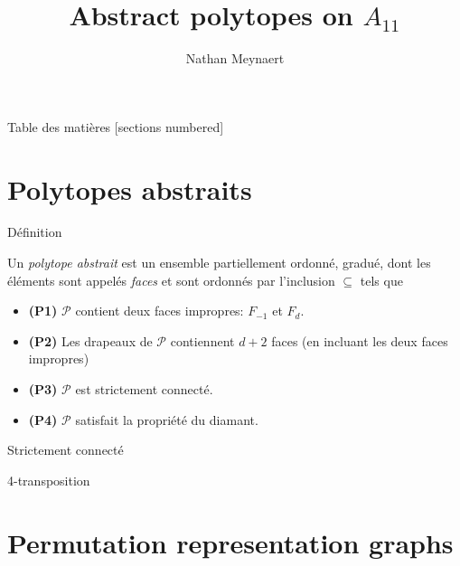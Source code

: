 \documentclass[10pt]{beamer}
\title{Abstract polytopes on $A_{11}$}
\date{}
\author{Nathan Meynaert}
\begin{document}
\maketitle

\begin{frame}{Table des matières}
  [sections numbered]
  \tableofcontents[hideallsubsections]
\end{frame}

\section{Polytopes abstraits}

\begin{frame}{Définition}

  \begin{definition}
    Un \textit{polytope abstrait} est un ensemble partiellement ordonné, gradué,  dont les éléments sont appelés \textit{faces} et sont ordonnés par l'inclusion $\subseteq$ tels que
    \begin{itemize}
      \item \textbf{(P1)} $\mathcal P$ contient deux faces impropres: $F_{-1}$ et $F_d$.
      \item \textbf{(P2)} Les drapeaux de $\mathcal P$ contiennent $d+2$ faces (en incluant les deux faces impropres)    \item \textbf{(P3)} $\mathcal P$ est strictement connecté.
      \item \textbf{(P4)} $\mathcal P$ satisfait la propriété du diamant.
    \end{itemize}
  \end{definition}

\end{frame}

\begin{frame}{Strictement connecté}
\end{frame}

\begin{frame}{4-transposition}
\end{frame}

\section{Permutation representation graphs}
\end{document}
